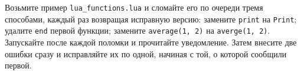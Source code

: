 \begin{taskbox}
Возьмите пример \texttt{lua\_functions.lua} и сломайте его по очереди тремя способами, каждый раз возвращая исправную версию: замените \verb|print| на \verb|Print|; удалите \verb|end| первой функции; замените \verb|average(1, 2)| на \verb|averge(1, 2)|. Запускайте после каждой поломки и прочитайте уведомление. Затем внесите две ошибки сразу и исправляйте их по одной, начиная с той, о которой сообщили первой.
\end{taskbox}

